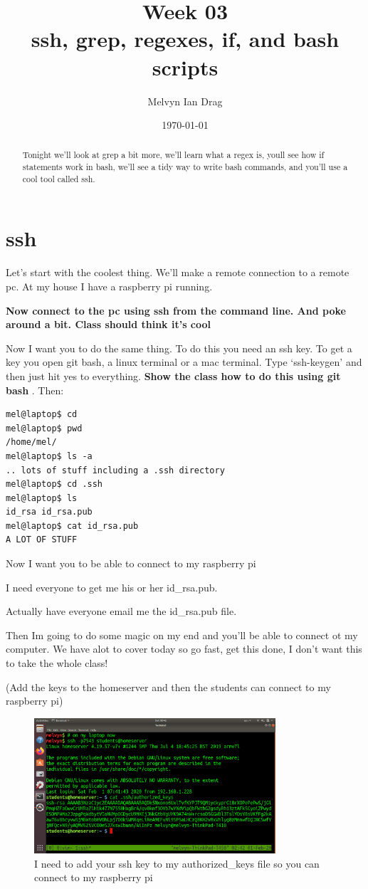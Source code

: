 \documentclass[10pt]{article}
\title{\textbf{Week 03} \\
ssh, grep, regexes, if, and bash scripts
}
\author{
	Melvyn Ian Drag
}
\date{\today}
\begin{document}
\maketitle

\begin{abstract}
Tonight we'll look at grep a bit more, we'll learn what a regex is, youll see
how if statements work in bash, we'll see a tidy way to write bash commands, and
you'll use a cool tool called ssh.
\end{abstract}

\section{ssh}
Let's start with the coolest thing. We'll make a remote connection to a remote
pc. At my house I have a raspberry pi running. 

{\LARGE \textbf{Now connect to the pc using ssh from the command line. And poke
around a bit. Class should think it's cool}}

Now I want you to do the same thing. To do this you need an ssh key. To get a
key you open git bash, a linux terminal or a mac terminal. Type `ssh-keygen' and
then just hit yes to everything. \textbf{Show the class how to do this using git
bash }. Then:

\begin{lstlisting}[style=term]
mel@laptop$ cd 
mel@laptop$ pwd
/home/mel/
mel@laptop$ ls -a
.. lots of stuff including a .ssh directory
mel@laptop$ cd .ssh
mel@laptop$ ls 
id_rsa id_rsa.pub
mel@laptop$ cat id_rsa.pub
A LOT OF STUFF
\end{lstlisting}

Now I want you to be able to connect to my raspberry pi

I need everyone to get me his or her id\_rsa.pub.

Actually have everyone email me the id\_rsa.pub file.


Then Im going to do some magic on my end and you'll be able to connect ot my
computer. We have alot to cover today so go fast, get this done, I don't want
this to take the whole class!

(Add the keys to the homeserver and then the students can connect to my
raspberry pi)

\begin{figure}[h]
\centering
	\includegraphics[width=0.8\textwidth]{Images/sshToHomeserver.png}
	\caption{I need to add your ssh key to my authorized\_keys file so you can
connect to my raspberry pi}
	\label{fig:firstssh}
\end{figure}
\end{document}
